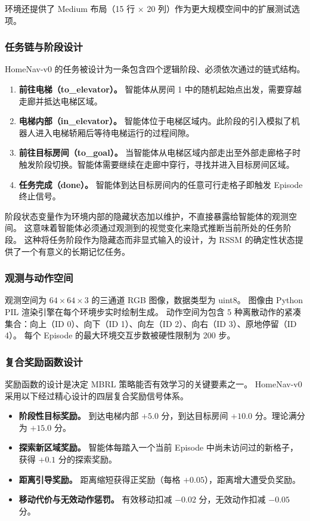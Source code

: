\documentclass[12pt,a4paper]{ctexart}
\begin{document}
环境还提供了 Medium 布局（15 行 $\times$ 20 列）作为更大规模空间中的扩展测试选项。

\subsubsection{任务链与阶段设计}

HomeNav-v0 的任务被设计为一条包含四个逻辑阶段、必须依次通过的链式结构。

\begin{enumerate}[label=\textbf{Phase \arabic*:},itemsep=3pt]
    \item \textbf{前往电梯（to\_elevator）。} 智能体从房间 1 中的随机起始点出发，需要穿越走廊并抵达电梯区域。
    \item \textbf{电梯内部（in\_elevator）。} 智能体位于电梯区域内。此阶段的引入模拟了机器人进入电梯轿厢后等待电梯运行的过程间隙。
    \item \textbf{前往目标房间（to\_goal）。} 当智能体从电梯区域内部走出至外部走廊格子时触发阶段切换。智能体需要继续在走廊中穿行，寻找并进入目标房间区域。
    \item \textbf{任务完成（done）。} 智能体到达目标房间内的任意可行走格子即触发 Episode 终止信号。
\end{enumerate}

阶段状态变量作为环境内部的隐藏状态加以维护，不直接暴露给智能体的观测空间。
这意味着智能体必须通过观测到的视觉变化来隐式推断当前所处的任务阶段。
这种将任务阶段作为隐藏态而非显式输入的设计，为 RSSM 的确定性状态提供了一个有意义的长期记忆任务。

\subsubsection{观测与动作空间}

观测空间为 $64 \times 64 \times 3$ 的三通道 RGB 图像，数据类型为 uint8。
图像由 Python PIL 渲染引擎在每个环境步实时绘制生成。
动作空间为包含 5 种离散动作的紧凑集合：向上（ID 0）、向下（ID 1）、向左（ID 2）、向右（ID 3）、原地停留（ID 4）。
每个 Episode 的最大环境交互步数被硬性限制为 200 步。

\subsubsection{复合奖励函数设计}

奖励函数的设计是决定 MBRL 策略能否有效学习的关键要素之一。
HomeNav-v0 采用以下经过精心设计的四层复合奖励信号体系。

\begin{itemize}[itemsep=3pt]
    \item \textbf{阶段性目标奖励。} 到达电梯内部 $+5.0$ 分，到达目标房间 $+10.0$ 分。理论满分为 $+15.0$ 分。
    \item \textbf{探索新区域奖励。} 智能体每踏入一个当前 Episode 中尚未访问过的新格子，获得 $+0.1$ 分的探索奖励。
    \item \textbf{距离引导奖励。} 距离缩短获得正奖励（每格 $+0.05$），距离增大遭受负奖励。
    \item \textbf{移动代价与无效动作惩罚。} 有效移动扣减 $-0.02$ 分，无效动作扣减 $-0.05$ 分。
\end{itemize}
\end{document}
